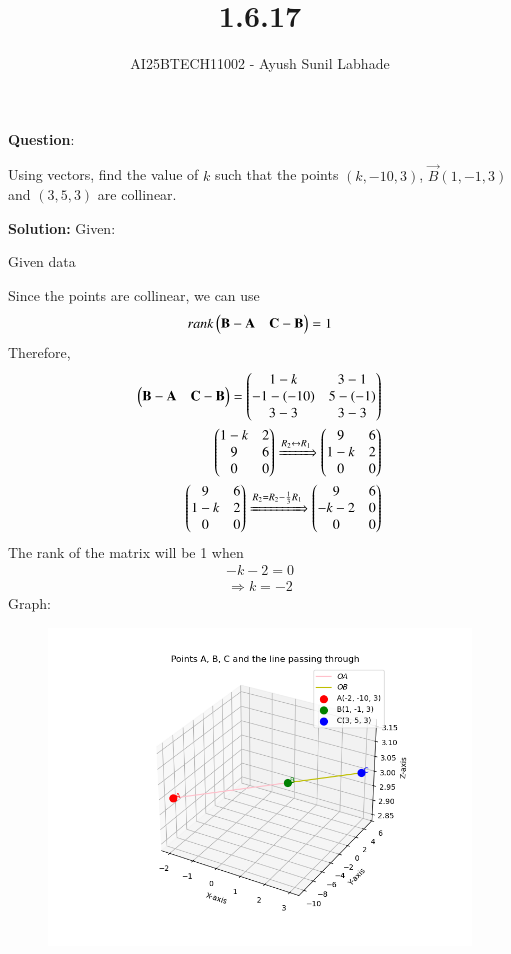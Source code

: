 \documentclass[journal,12pt,onecolumn]{IEEEtran}
\begin{document}
\title{1.6.17}
\author{AI25BTECH11002 - Ayush Sunil Labhade}
{\let\newpage\relax\maketitle}
		\textbf{Question}:\newline

		Using vectors, find the value of $k$ such that the points $(k , -10, 3)$, $\vec{B}(1, -1, 3)$ and $(3, 5, 3)$ are collinear.

		\textbf{Solution:}
		Given:
		\begin{table}[H]
			\centering
			
			\label{}
			\caption{Given data}
		\end{table}
		Since the points are collinear, we can use 
		\begin{align}
			rank\begin{pmatrix}\mathbf{B}-\mathbf{A} & \mathbf{C}-\mathbf{B}\end{pmatrix} = 1	
		\end{align}
		Therefore,
		\begin{align}
			\begin{pmatrix}\mathbf{B}-\mathbf{A} & \mathbf{C}-\mathbf{B}\end{pmatrix} = \begin{pmatrix}1-k & 3-1\\-1-(-10) & 5-(-1)\\3-3 & 3-3\end{pmatrix}	
			\\
			\begin{pmatrix}1-k & 2\\9 & 6\\0 & 0\end{pmatrix}
			\xRightarrow[]{R_2 \leftrightarrow R_1} 
			\begin{pmatrix}9 & 6 \\1-k & 2\\0 & 0\end{pmatrix} 
			\\
			\begin{pmatrix}9 & 6\\1-k & 2\\0 & 0\end{pmatrix}
			\xRightarrow[]{R_2= R_2-\frac{1}{3}R_1} 
			\begin{pmatrix}9 & 6\\ -k-2 & 0 \\ 0 & 0\end{pmatrix} 
		\end{align}
		The rank of the matrix will be 1 when 
		\begin{align}
		-k-2 = 0
		\end{align}
		\begin{align}
		\Rightarrow k = -2
		\end{align}
		\newpage
		Graph:
\begin{figure}[H]
	\centering
	\includegraphics[scale=0.5]{plot}
	\caption*{}
	\label{fig}
\end{figure}
\end{document}
